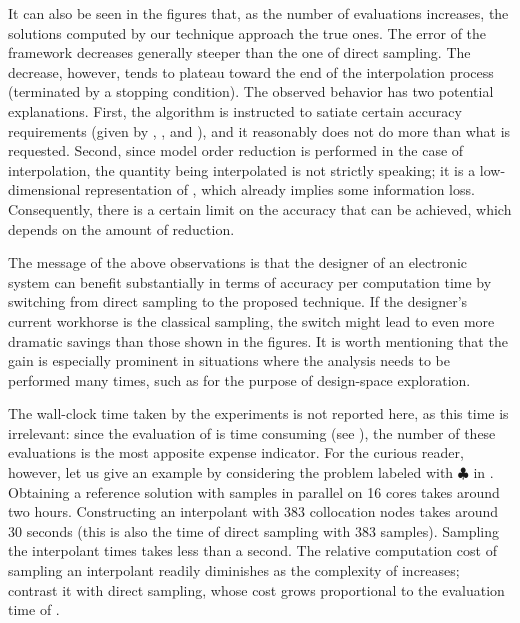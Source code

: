 It can also be seen in the figures that, as the number of evaluations increases,
the solutions computed by our technique approach the true ones. The error of the
framework decreases generally steeper than the one of direct sampling. The
decrease, however, tends to plateau toward the end of the interpolation process
(terminated by a stopping condition). The observed behavior has two potential
explanations. First, the algorithm is instructed to satiate certain accuracy
requirements (given by , , and ), and it reasonably
does not do more than what is requested. Second, since model order reduction is
performed in the case of interpolation, the quantity being interpolated is not
\g strictly speaking; it is a low-dimensional representation of \g, which
already implies some information loss. Consequently, there is a certain limit on
the accuracy that can be achieved, which depends on the amount of reduction.

The message of the above observations is that the designer of an electronic
system can benefit substantially in terms of accuracy per computation time by
switching from direct sampling to the proposed technique. If the designer's
current workhorse is the classical  sampling, the switch might lead to
even more dramatic savings than those shown in the figures. It is worth
mentioning that the gain is especially prominent in situations where the
analysis needs to be performed many times, such as for the purpose of
design-space exploration.

\begin{remark}
The wall-clock time taken by the experiments is not reported here, as this time
is irrelevant: since the evaluation of \g is time consuming (see
), the number of these evaluations is the most apposite
expense indicator. For the curious reader, however, let us give an example by
considering the problem labeled with $\clubsuit$ in
. Obtaining a reference solution with
 samples in parallel on 16 cores takes around two hours.
Constructing an interpolant with 383 collocation nodes takes around 30 seconds
(this is also the time of direct sampling with 383 samples). Sampling the
interpolant  times takes less than a second. The relative
computation cost of sampling an interpolant readily diminishes as the complexity
of \g increases; contrast it with direct sampling, whose cost grows proportional
to the evaluation time of \g.
\end{remark}

